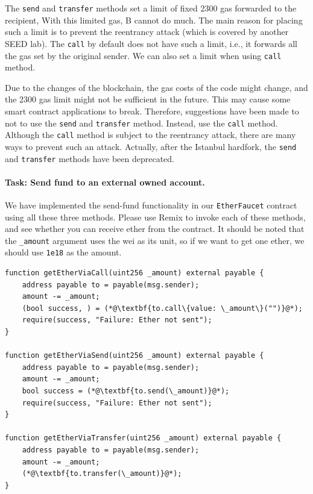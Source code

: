 The \texttt{send} and \texttt{transfer} methods set a limit 
of fixed 2300 gas forwarded to the recipient, 
With this limited gas, B cannot do much. The main reason for placing such a limit 
is to prevent the reentrancy attack (which is covered by another SEED lab). 
The \texttt{call} by default does not have such a limit, i.e., it 
forwards all the gas set by the original sender. 
We can also set a limit when using \texttt{call} method. 

Due to the changes of the blockchain, the gas costs of the code 
might change, and the 2300 gas limit might not be sufficient in the future. 
This may cause some smart contract applications to break. 
Therefore, suggestions have been
made to not to use the \texttt{send} and \texttt{transfer} 
method. Instead, use the \texttt{call} method. Although the 
\texttt{call} method is subject to the reentrancy attack,
there are many ways to prevent such an attack. 
Actually, after the Istanbul hardfork,
the \texttt{send} and \texttt{transfer} methods have been deprecated.






\paragraph{Task: Send fund to an external owned account.} 
We have implemented the send-fund functionality 
in our \texttt{EtherFaucet} contract using all these three methods. 
Please use Remix to invoke each of these methods, and see 
whether you can receive ether from the contract. 
It should be noted that the \texttt{\_amount} argument 
uses the wei as its unit, so if we want to get one ether, 
we should use \texttt{1e18} as the amount. 

\begin{lstlisting}
function getEtherViaCall(uint256 _amount) external payable {
    address payable to = payable(msg.sender);
    amount -= _amount;
    (bool success, ) = (*@\textbf{to.call\{value: \_amount\}("")}@*);
    require(success, "Failure: Ether not sent");
}

function getEtherViaSend(uint256 _amount) external payable {
    address payable to = payable(msg.sender);
    amount -= _amount;
    bool success = (*@\textbf{to.send(\_amount)}@*);
    require(success, "Failure: Ether not sent");
}

function getEtherViaTransfer(uint256 _amount) external payable {
    address payable to = payable(msg.sender);
    amount -= _amount;
    (*@\textbf{to.transfer(\_amount)}@*);
}
\end{lstlisting}
 
